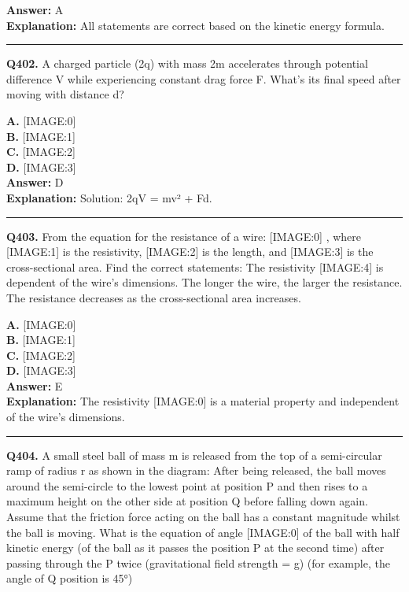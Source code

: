 \documentclass[12pt]{article}
\begin{document}
\textbf{Answer:} A \\
\textbf{Explanation:} All statements are correct based on the kinetic energy formula.

\hrule
\vspace{1em}


\noindent
\textbf{Q402.} A charged particle (2q) with mass 2m accelerates through potential difference V while experiencing constant drag force F. What's its final speed after moving with distance d?



\textbf{A.} [IMAGE:0] \\
\textbf{B.} [IMAGE:1] \\
\textbf{C.} [IMAGE:2] \\
\textbf{D.} [IMAGE:3] \\

\textbf{Answer:} D \\
\textbf{Explanation:} Solution: 2qV = mv² + Fd.

\hrule
\vspace{1em}


\noindent
\textbf{Q403.} From the equation for the resistance of a wire:
[IMAGE:0]
, where
[IMAGE:1]
is the resistivity,
[IMAGE:2]
is the length, and
[IMAGE:3]
is the cross-sectional area. Find the correct statements:
The resistivity
[IMAGE:4]
is dependent of the wire's dimensions.
The longer the wire, the larger the resistance.
The resistance decreases as the cross-sectional area increases.



\textbf{A.} [IMAGE:0] \\
\textbf{B.} [IMAGE:1] \\
\textbf{C.} [IMAGE:2] \\
\textbf{D.} [IMAGE:3] \\

\textbf{Answer:} E \\
\textbf{Explanation:} The resistivity
[IMAGE:0]
is a material property and independent of the wire's dimensions.

\hrule
\vspace{1em}


\noindent
\textbf{Q404.} A small steel ball of mass m is released from the top of a semi-circular ramp of radius r as shown in the diagram:
After being released, the ball moves around the semi-circle to the lowest point at position P and then rises to a maximum height on the other side at position Q before falling down again. Assume that the friction force acting on the ball has a constant magnitude whilst the ball is moving. What is the equation of angle
[IMAGE:0]
of the ball with half kinetic energy (of the ball as it passes the position P at the second time) after passing through the P twice (gravitational field strength = g) (for example, the angle of Q position is 45°)
\end{document}
